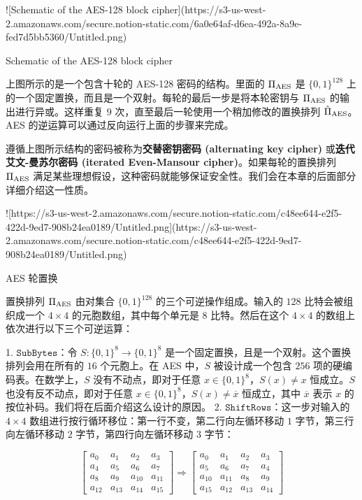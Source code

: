 ![Schematic of the AES-128 block cipher](https://s3-us-west-2.amazonaws.com/secure.notion-static.com/6a0e64af-d6ea-492a-8a9e-fed7d5bb5360/Untitled.png)

Schematic of the AES-128 block cipher

上图所示的是一个包含十轮的 AES-128 密码的结构。里面的 $\Pi_{\rm AES}$ 是 $\{0,1\}^{128}$ 上的一个固定置换，而且是一个双射。每轮的最后一步是将本轮密钥与 $\Pi_{\rm AES}$ 的输出进行异或。这样重复 $9$ 次，直至最后一轮使用一个稍加修改的置换排列 $\hat\Pi_{\rm AES}$。AES 的逆运算可以通过反向运行上面的步骤来完成。

遵循上图所示结构的密码被称为\textbf{交替密钥密码 (alternating key cipher)} 或\textbf{迭代艾文-曼苏尔密码 (iterated Even-Mansour cipher)}。如果每轮的置换排列 $\Pi_{\rm AES}$ 满足某些理想假设，这种密码就能够保证安全性。我们会在本章的后面部分详细介绍这一性质。

![https://s3-us-west-2.amazonaws.com/secure.notion-static.com/c48ee644-e2f5-422d-9ed7-908b24ea0189/Untitled.png](https://s3-us-west-2.amazonaws.com/secure.notion-static.com/c48ee644-e2f5-422d-9ed7-908b24ea0189/Untitled.png)

AES 轮置换

置换排列 $\Pi_{\rm AES}$ 由对集合 $\{0,1\}^{128}$ 的三个可逆操作组成。输入的 $128$ 比特会被组织成一个 $4\times4$ 的元胞数组，其中每个单元是 $8$ 比特。然后在这个 $4\times4$ 的数组上依次进行以下三个可逆运算：

1. $\mathtt{SubBytes}$：令 $S:\{0,1\}^8\to\{0,1\}^8$ 是一个固定置换，且是一个双射。这个置换排列会用在所有的 $16$ 个元胞上。在 AES 中，$S$ 被设计成一个包含 $256$ 项的硬编码表。在数学上，$S$ 没有不动点，即对于任意 $x\in\{0,1\}^8$，$S(x)\neq x$ 恒成立。$S$ 也没有反不动点，即对于任意 $x\in\{0,1\}^8$，$S(x)\neq \overline x$ 恒成立，其中 $\overline x$ 表示 $x$ 的按位补码。我们将在后面介绍这么设计的原因。
2. $\mathtt{ShiftRows}$：这一步对输入的 $4\times4$ 数组进行按行循环移位：第一行不变，第二行向左循环移动 $1$ 字节，第三行向左循环移动 $2$ 字节，第四行向左循环移动 $3$ 字节：
    
    $$
    \left[
    \begin{matrix}
       a_0 & a_1 & a_2 & a_3\\
       a_4 & a_5 & a_6 & a_7\\
       a_8 & a_9 & a_{10} & a_{11}\\
       a_{12} & a_{13} & a_{14} & a_{15}
    \end{matrix}
    \right]
    \Longrightarrow
    \left[
    \begin{matrix}
       a_0 & a_1 & a_2 & a_3\\
       a_5 & a_6 & a_7 & a_4\\
       a_{10} & a_{11} & a_{8} & a_{9}\\
       a_{15} & a_{12} & a_{13} & a_{14}
    \end{matrix}
    \right]
    $$
    

